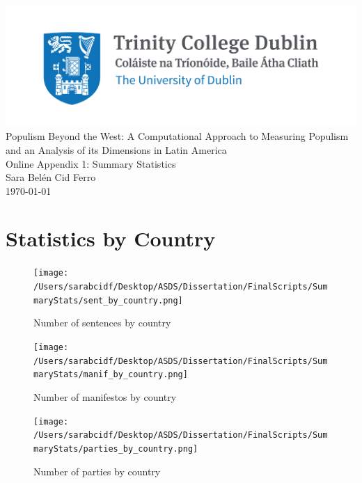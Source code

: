 \documentclass[12pt,letterpaper]{article}
\begin{document}
	
	
	\begin{titlepage}
		\centering
		\vspace*{1cm} %
		
		\includegraphics[width=\textwidth]{Trinity_RGB_transparent_main.png}\\[1cm]
		
		{\LARGE Populism Beyond the West: A Computational Approach to Measuring Populism and an Analysis of its Dimensions in Latin America}\\[1cm]
		{\Large Online Appendix 1: Summary Statistics}\\[0.3cm]
		
		\Large Sara Belén Cid Ferro \\[1cm]
		
		{\large \today}
	\end{titlepage}
	
	
	\tableofcontents
	\listoffigures
	
	\section{Statistics by Country}
	
	\begin{figure}[H]
		\centering
		\caption{Number of sentences by country}
		\label{fig:yourfigure}
		\texttt{[image: /Users/sarabcidf/Desktop/ASDS/Dissertation/FinalScripts/SummaryStats/sent\_by\_country.png]} 
	\end{figure}
	
	\begin{figure}[H]
		\centering
		\caption{Number of manifestos by country}
		\label{fig:yourfigure}
		\texttt{[image: /Users/sarabcidf/Desktop/ASDS/Dissertation/FinalScripts/SummaryStats/manif\_by\_country.png]} 
	\end{figure}
	
	\begin{figure}[H]
		\centering
		\caption{Number of parties by country}
		\label{fig:yourfigure}
		\texttt{[image: /Users/sarabcidf/Desktop/ASDS/Dissertation/FinalScripts/SummaryStats/parties\_by\_country.png]} 
	\end{figure}
	
\end{document}
